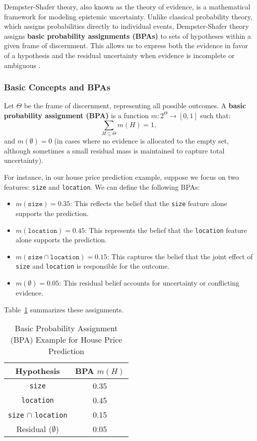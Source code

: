 \documentclass[acmlarge]{acmart}
\begin{document}
Dempster-Shafer theory, also known as the theory of evidence, is a mathematical framework for modeling epistemic uncertainty. Unlike classical probability theory, which assigns probabilities directly to individual events, Dempster-Shafer theory assigns \textbf{basic probability assignments (BPAs)} to sets of hypotheses within a given frame of discernment. This allows us to express both the evidence in favor of a hypothesis and the residual uncertainty when evidence is incomplete or ambiguous \cite{shafer1976mathematical}.

\subsubsection{Basic Concepts and BPAs}

Let \(\Theta\) be the frame of discernment, representing all possible outcomes. A \textbf{basic probability assignment (BPA)} is a function \( m: 2^{\Theta} \rightarrow [0,1] \) such that:
\[
\sum_{H \subseteq \Theta} m(H) = 1,
\]
and \( m(\emptyset) = 0 \) (in cases where no evidence is allocated to the empty set, although sometimes a small residual mass is maintained to capture total uncertainty).

For instance, in our house price prediction example, suppose we focus on two features: \texttt{size} and \texttt{location}. We can define the following BPAs:
\begin{itemize}
    \item \( m(\texttt{size}) = 0.35 \): This reflects the belief that the \texttt{size} feature alone supports the prediction.
    \item \( m(\texttt{location}) = 0.45 \): This represents the belief that the \texttt{location} feature alone supports the prediction.
    \item \( m(\texttt{size} \cap \texttt{location}) = 0.15 \): This captures the belief that the joint effect of \texttt{size} and \texttt{location} is responsible for the outcome.
    \item \( m(\emptyset) = 0.05 \): This residual belief accounts for uncertainty or conflicting evidence.
\end{itemize}

Table~\ref{tab:bpa_example} summarizes these assignments.

\begin{table}[H]
    \caption{Basic Probability Assignment (BPA) Example for House Price Prediction}
    \label{tab:bpa_example}
    \centering
    \begin{tabular}{|c|c|}
        \hline
        \textbf{Hypothesis} & \textbf{BPA \( m(H) \)} \\
        \hline
        \texttt{size} & 0.35 \\
        \hline
        \texttt{location} & 0.45 \\
        \hline
        \texttt{size} \(\cap\) \texttt{location} & 0.15 \\
        \hline
        Residual (\( \emptyset \)) & 0.05 \\
        \hline
    \end{tabular}
\end{table}
\end{document}
